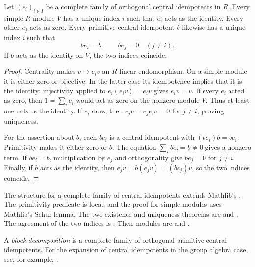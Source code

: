 \begin{proposition}
\label{lib:blocks:unique-support}
Let $(e_i)_{i\in I}$ be a complete family of orthogonal central
idempotents in $R$.
Every simple $R$-module $V$ has a unique index $i$ such that $e_i$ acts
as the identity. Every other $e_j$ acts as zero.
Every primitive central idempotent $b$ likewise has a unique index $i$
such that
\[
 be_i=b,\qquad be_j=0\quad(j\ne i).
\]
If $b$ acts as the identity on $V$, the two indices coincide.
\end{proposition}
\begin{proof}
Centrality makes $v\mapsto e_i v$ an $R$-linear endomorphism. On a
simple module it is either zero or bijective. In the latter case its
idempotence implies that it is the identity: injectivity applied to
$e_i(e_i v)=e_i v$ gives $e_i v=v$. If every $e_i$ acted as zero, then
$1=\sum_i e_i$ would act as zero on the nonzero module $V$. Thus at least
one acts as the identity. If $e_i$ does, then
$e_jv=e_je_iv=0$ for $j\ne i$, proving uniqueness.

For the assertion about $b$, each $be_i$ is a central idempotent with
$(be_i)b=be_i$. Primitivity makes it either zero or $b$. The equation
$\sum_i be_i=b\ne0$ gives a nonzero term. If $be_i=b$, multiplication
by $e_j$ and orthogonality give $be_j=0$ for $j\ne i$.
Finally, if $b$ acts as the identity, then
$e_jv=b(e_jv)=(be_j)v$, so the two indices coincide.
\end{proof}

\begin{implementation}
The structure for a complete family of central idempotents extends Mathlib's
. The primitivity predicate is local,
and the proof for simple modules uses Mathlib's Schur lemma.
The two existence and uniqueness theorems are
and .
The agreement of the two indices is
.
Their modules are  and
.
\end{implementation}

A \emph{block decomposition} is a complete family of orthogonal
primitive central idempotents. For the expansion of central idempotents in
the group algebra case, see, for example,
\cite[Theorem~3.11]{Navarro1998}.


